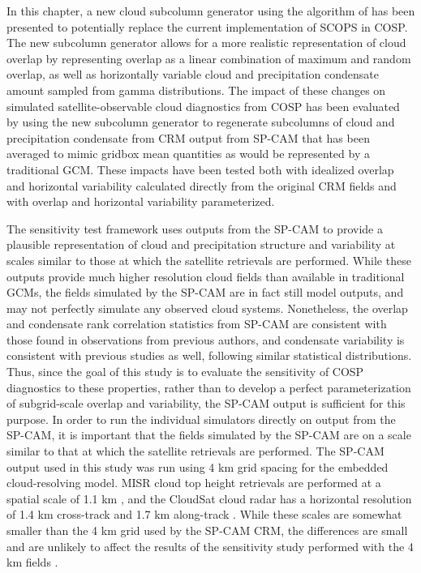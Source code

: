In this chapter, a new cloud subcolumn generator using the algorithm of
\citet{raisanen_et_al_2004} has been presented to potentially replace
the current implementation of SCOPS in COSP. The new subcolumn generator
allows for a more realistic representation of cloud overlap by
representing overlap as a linear combination of maximum and random
overlap, as well as horizontally variable cloud and precipitation
condensate amount sampled from gamma distributions. The impact of these
changes on simulated satellite-observable cloud diagnostics from COSP
has been evaluated by using the new subcolumn generator to regenerate
subcolumns of cloud and precipitation condensate from CRM output from
SP-CAM that has been averaged to mimic gridbox mean quantities as would
be represented by a traditional GCM. These impacts have been tested both
with idealized overlap and horizontal variability calculated directly
from the original CRM fields and with overlap and horizontal variability
parameterized.

The sensitivity test framework uses outputs from the SP-CAM to provide a
plausible representation of cloud and precipitation structure and
variability at scales similar to those at which the satellite retrievals
are performed. While these outputs provide much higher resolution cloud
fields than available in traditional GCMs, the fields simulated by the
SP-CAM are in fact still model outputs, and may not perfectly simulate
any observed cloud systems. Nonetheless, the overlap and condensate rank
correlation statistics from SP-CAM are consistent with those found in
observations from previous authors, and condensate variability is
consistent with previous studies as well, following similar statistical
distributions. Thus, since the goal of this study is to evaluate the
sensitivity of COSP diagnostics to these properties, rather than to
develop a perfect parameterization of subgrid-scale overlap and
variability, the SP-CAM output is sufficient for this purpose. In order
to run the individual simulators directly on output from the SP-CAM, it
is important that the fields simulated by the SP-CAM are on a scale
similar to that at which the satellite retrievals are performed. The
SP-CAM output used in this study was run using 4 km grid spacing for the
embedded cloud-resolving model. MISR cloud top height retrievals are
performed at a spatial scale of 1.1 km \citep{moroney_et_al_2002}, and
the CloudSat cloud radar has a horizontal resolution of 1.4 km
cross-track and 1.7 km along-track \citep{tanelli_et_al_2008}. While
these scales are somewhat smaller than the 4 km grid used by the SP-CAM
CRM, the differences are small and are unlikely to affect the results of
the sensitivity study performed with the 4 km fields
\citep{marchand_and_ackerman_2010}.

